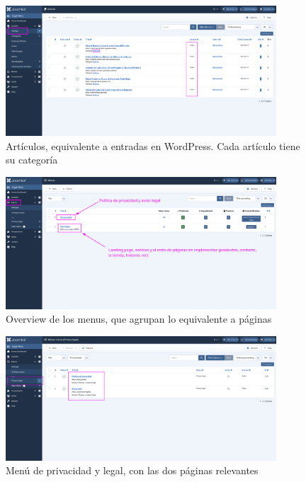 \documentclass[a4paper]{article}
\begin{document}
\begin{figure}[H]
    \centering
    \includegraphics[width=0.9\textwidth]{images/backend-articles.png}
    \captionsetup{width=0.85\textwidth}
    \caption{Artículos, equivalente a entradas en WordPress. Cada artículo tiene su categoría}
\end{figure}

\begin{figure}[H]
    \centering
    \includegraphics[width=0.9\textwidth]{images/backend-menus-overview.png}
    \captionsetup{width=0.85\textwidth}
    \caption{Overview de los menus, que agrupan lo equivalente a páginas}
\end{figure}

\begin{figure}[H]
    \centering
    \includegraphics[width=0.9\textwidth]{images/backend-menu-privacy.png}
    \captionsetup{width=0.85\textwidth}
    \caption{Menú de privacidad y legal, con las dos páginas relevantes}
\end{figure}
\end{document}
